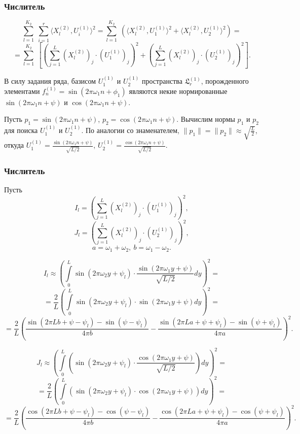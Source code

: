 \documentclass[11pt]{beamer}
\begin{document}
	\begin{frame}
		\frametitle{Числитель}
		$$ \sum\limits_{l=1}^{K_2}\;\sum\limits_{i=1}^{r}\langle X_l^{(2)}, U_i^{(1)}\rangle^2 = 
		\sum\limits_{l=1}^{K_2}\;\left ( \langle X_l^{(2)}, U_1^{(1)}\rangle^2 + \langle X_l^{(2)}, U_2^{(1)}\rangle^2 \right ) = $$
		$$ =  \sum\limits_{l=1}^{K_2}\; \left [ \left (\sum\limits_{j=1}^{L}(X_{l}^{(2)})_j\cdot (U_{1}^{(1)})_j\right )^2 + \left ( \sum\limits_{j=1}^{L}(X_{l}^{(2)})_j\cdot (U_{2}^{(1)})_j\right )^2 \right ].$$
		
		В силу задания ряда, базисом $ U_{1}^{(1)} $ и $U_{2}^{(1)} $ пространства $ \mathfrak{L}_r^{(1)} $, порожденного элементами $ f_n^{(1)} = \sin(2\pi\omega_1 n + \phi_1) $ являются некие нормированные $ \sin(2\pi\omega_1 n + \psi) $ и $ \cos(2\pi\omega_1 n + \psi) $.
		
		Пусть $ p_1 = \sin(2\pi\omega_1 n + \psi) $, $ p_2 = \cos(2\pi\omega_1 n + \psi) $. Вычислим нормы $ p_1 $ и $ p_2 $ для поиска $ U_{1}^{(1)} $ и $U_{2}^{(1)} $. 
		По аналогии со знаменателем, $ \|p_1\| = \|p_2\| \approx \sqrt{\frac{L}{2}} $, откуда $ U_{1}^{(1)} = \frac{\sin(2\pi\omega_1 n + \psi)}{\sqrt{L/2}} $, $ U_{2}^{(1)} = \frac{\cos(2\pi\omega_1 n + \psi)}{\sqrt{L/2}} $.
		
	\end{frame}

	\begin{frame}
		\frametitle{Числитель}
		Пусть  
		$$ I_l =  \left (\sum\limits_{j=1}^{L}(X_{l}^{(2)})_j\cdot (U_{1}^{(1)})_j\right )^2, $$
		$$ J_l =  \left (\sum\limits_{j=1}^{L}(X_{l}^{(2)})_j\cdot (U_{2}^{(1)})_j\right )^2, $$
		$$ a = \omega_1 + \omega_2,\ b = \omega_1 - \omega_2. $$
	\end{frame}
	\begin{frame}
		\small
		$$ I_l \approx \left( \int\limits_{0}^{L}\sin(2\pi\omega_2 y + \psi_l) \cdot \frac{\sin(2\pi\omega_1 y + \psi)}{\sqrt{L/2}}dy \right)^2 = $$
		$$ = \frac{2}{L} \left(\int\limits_{0}^{L}\sin(2\pi\omega_2 y + \psi_l) \cdot \sin(2\pi\omega_1 y + \psi)dy\right )^2 = $$
		$$ = \frac{2}{L} 
		\left(  
		\frac{\sin(2\pi Lb + \psi - \psi_l) - \sin(\psi - \psi_l)}{4\pi b} - \frac{\sin(2\pi La + \psi + \psi_l) - \sin(\psi + \psi_l)}{4\pi a}
		\right)^2. $$
		
	\end{frame}

	\begin{frame}
		\footnotesize
		$$ J_l \approx \left(\int\limits_{0}^{L}(\sin(2\pi\omega_2 y + \psi_l) \cdot \frac{\cos(2\pi\omega_1 y + \psi)}{\sqrt{L/2}})dy\right)^2 = $$
		$$ = \frac{2}{L}\left(\int\limits_{0}^{L}(\sin(2\pi\omega_2 y + \psi_l) \cdot\cos(2\pi\omega_1 y + \psi))dy\right )^2 = $$
		$$ = \frac{2}{L} 
		\left(  
		\frac{\cos(2\pi Lb + \psi - \psi_l) - \cos(\psi - \psi_l)}{4\pi b} - \frac{\cos(2\pi La + \psi + \psi_l) - \cos(\psi + \psi_l)}{4\pi a}
		\right)^2. $$
		
	\end{frame}
\end{document}
